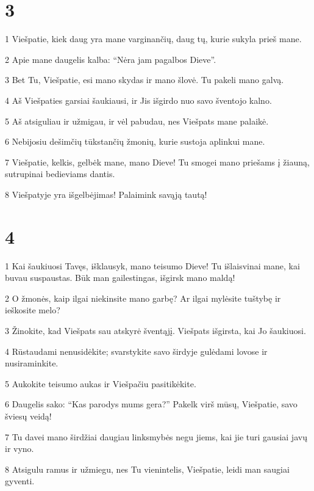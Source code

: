 \chapter{3}


\par 1 Viešpatie, kiek daug yra mane varginančių, daug tų, kurie sukyla prieš mane. 
\par 2 Apie mane daugelis kalba: “Nėra jam pagalbos Dieve”. 
\par 3 Bet Tu, Viešpatie, esi mano skydas ir mano šlovė. Tu pakeli mano galvą. 
\par 4 Aš Viešpaties garsiai šaukiausi, ir Jis išgirdo nuo savo šventojo kalno. 
\par 5 Aš atsiguliau ir užmigau, ir vėl pabudau, nes Viešpats mane palaikė. 
\par 6 Nebijosiu dešimčių tūkstančių žmonių, kurie sustoja aplinkui mane. 
\par 7 Viešpatie, kelkis, gelbėk mane, mano Dieve! Tu smogei mano priešams į žiauną, sutrupinai bedieviams dantis. 
\par 8 Viešpatyje yra išgelbėjimas! Palaimink savąją tautą!



\chapter{4}


\par 1 Kai šaukiuosi Tavęs, išklausyk, mano teisumo Dieve! Tu išlaisvinai mane, kai buvau suspaustas. Būk man gailestingas, išgirsk mano maldą! 
\par 2 O žmonės, kaip ilgai niekinsite mano garbę? Ar ilgai mylėsite tuštybę ir ieškosite melo? 
\par 3 Žinokite, kad Viešpats sau atskyrė šventąjį. Viešpats išgirsta, kai Jo šaukiuosi. 
\par 4 Rūstaudami nenusidėkite; svarstykite savo širdyje gulėdami lovose ir nusiraminkite. 
\par 5 Aukokite teisumo aukas ir Viešpačiu pasitikėkite. 
\par 6 Daugelis sako: “Kas parodys mums gera?” Pakelk virš mūsų, Viešpatie, savo šviesų veidą! 
\par 7 Tu davei mano širdžiai daugiau linksmybės negu jiems, kai jie turi gausiai javų ir vyno. 
\par 8 Atsigulu ramus ir užmiegu, nes Tu vienintelis, Viešpatie, leidi man saugiai gyventi.



